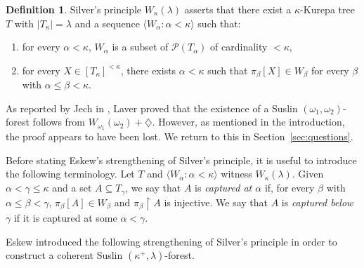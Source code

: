 \documentclass[]{amsart}
\theoremstyle{definition}
\newtheorem{definition}[theorem]{Definition}
\theoremstyle{remark}
\begin{document}
\begin{definition}
Silver's principle $W_\kappa(\lambda)$ asserts that there exist a $\kappa$-Kurepa tree $T$ with $|T_\kappa| = \lambda$ and a sequence $\langle W_\alpha : \alpha < \kappa\rangle$ such that:
\begin{enumerate}
\item for every $\alpha < \kappa$, $W_\alpha$ is a subset of $\mathcal{P}(T_\alpha)$ of cardinality  $<\kappa$,
\item for every $X \in [T_{\kappa}]^{<\kappa}$, there exists $\alpha < \kappa$ such that $\pi_\beta[X] \in W_\beta$ for every $\beta$ with $\alpha \le \beta < \kappa$.
\end{enumerate}
\end{definition}



As reported by Jech in \cite{MR506523}, Laver proved that the existence of a Suslin $(\omega_1, \omega_2)$-forest follows from $W_{\omega_1}(\omega_2) + \diamondsuit$. However, as mentioned in the introduction, the proof appears to have been lost. We return to this in Section~\ref{sec:questions}.


Before stating Eskew's strengthening of Silver's principle, it is useful to introduce the following terminology. Let $T$ and $\langle W_\alpha : \alpha < \kappa\rangle$ witness $W_\kappa(\lambda)$. Given $\alpha < \gamma \le \kappa$ and a set $A \subseteq T_\gamma$, we say that $A$ is \emph{captured at $\alpha$} if, for every $\beta$ with $\alpha \le \beta < \gamma$, $\pi_\beta[A] \in W_\beta$ and $\pi_\beta \upharpoonright A$ is injective. We say that $A$ is \emph{captured below $\gamma$} if it is captured at some $\alpha<\gamma$.

Eskew introduced the following strengthening of Silver's principle in order to construct a coherent Suslin $(\kappa^+, \lambda)$-forest.
\end{document}
